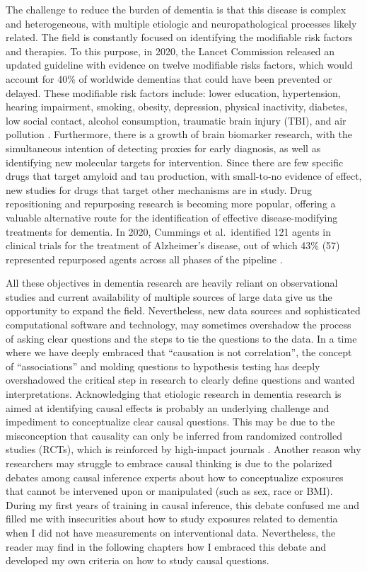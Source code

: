 \documentclass[
]{book}
\begin{document}
The challenge to reduce the burden of dementia is that this disease is complex and heterogeneous, with multiple etiologic and neuropathological processes likely related. The field is constantly focused on identifying the modifiable risk factors and therapies. To this purpose, in 2020, the Lancet Commission released an updated guideline with evidence on twelve modifiable risks factors, which would account for 40\% of worldwide dementias that could have been prevented or delayed. These modifiable risk factors include: lower education, hypertension, hearing impairment, smoking, obesity, depression, physical inactivity, diabetes, low social contact, alcohol consumption, traumatic brain injury (TBI), and air pollution \autocite{dementia_lancet}. Furthermore, there is a growth of brain biomarker research, with the simultaneous intention of detecting proxies for early diagnosis, as well as identifying new molecular targets for intervention. Since there are few specific drugs that target amyloid and tau production, with small-to-no evidence of effect, new studies for drugs that target other mechanisms are in study. Drug repositioning and repurposing research is becoming more popular, offering a valuable alternative route for the identification of effective disease-modifying treatments for dementia\autocite{ballard2020,langedijk2015}. In 2020, Cummings et al.~identified 121 agents in clinical trials for the treatment of Alzheimer's disease, out of which 43\% (57) represented repurposed agents across all phases of the pipeline \autocite{cummings2020}.

All these objectives in dementia research are heavily reliant on observational studies and current availability of multiple sources of large data give us the opportunity to expand the field. Nevertheless, new data sources and sophisticated computational software and technology, may sometimes overshadow the process of asking clear questions and the steps to tie the questions to the data. In a time where we have deeply embraced that ``causation is not correlation'', the concept of ``associations'' and molding questions to hypothesis testing has deeply overshadowed the critical step in research to clearly define questions and wanted interpretations. Acknowledging that etiologic research in dementia research is aimed at identifying causal effects is probably an underlying challenge and impediment to conceptualize clear causal questions. This may be due to the misconception that causality can only be inferred from randomized controlled studies (RCTs), which is reinforced by high-impact journals \autocite{jama}. Another reason why researchers may struggle to embrace causal thinking is due to the polarized debates among causal inference experts about how to conceptualize exposures that cannot be intervened upon or manipulated (such as sex, race or BMI)\autocite{waterkills,schwartz2016}. During my first years of training in causal inference, this debate confused me and filled me with insecurities about how to study exposures related to dementia when I did not have measurements on interventional data. Nevertheless, the reader may find in the following chapters how I embraced this debate and developed my own criteria on how to study causal questions.
\end{document}
